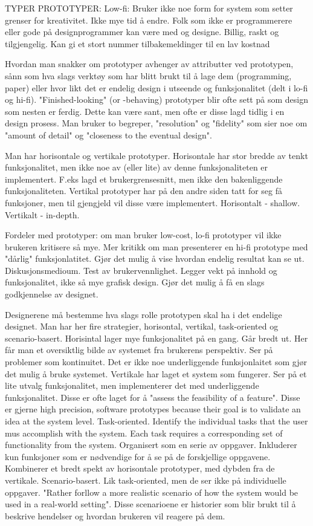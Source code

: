 TYPER PROTOTYPER:
Low-fi: Bruker ikke noe form for system som setter grenser for kreativitet. Ikke mye tid å endre. Folk som ikke er programmerere eller gode på designprogrammer kan være med og designe. Billig, raskt og tilgjengelig. Kan gi et stort nummer tilbakemeldinger til en lav kostnad

Hvordan man snakker om prototyper avhenger av attributter ved prototypen, sånn som hva slags verktøy som har blitt brukt til å lage dem (programming, paper) eller hvor likt det er endelig design i utseende og funksjonalitet (delt i lo-fi og hi-fi). "Finished-looking" (or -behaving) prototyper blir ofte sett på som design som nesten er ferdig. Dette kan være sant, men ofte er disse lagd tidlig i en design prosess. Man bruker to begreper, "resolution" og "fidelity" som sier noe om "amount of detail" og "closeness to the eventual design".

Man har horisontale og vertikale prototyper. Horisontale har stor bredde av tenkt funksjonalitet, men ikke noe av (eller lite) av denne funksjonaliteten er implementert. F.eks lagd et brukergrensesnitt, men ikke den bakenliggende funksjonaliteten. Vertikal prototyper har på den andre siden tatt for seg få funksjoner, men til gjengjeld vil disse være implementert. Horisontalt - shallow. Vertikalt - in-depth.

Fordeler med prototyper: om man bruker low-cost, lo-fi prototyper vil ikke brukeren kritisere så mye. Mer kritikk om man presenterer en hi-fi prototype med "dårlig" funksjonlatitet. Gjør det mulig å vise hvordan endelig resultat kan se ut. Diskusjonsmedioum. Test av brukervennlighet. Legger vekt på innhold og funksjonalitet, ikke så mye grafisk design. Gjør det mulig å få en slags godkjennelse av designet.

Designerene må bestemme hva slags rolle prototypen skal ha i det endelige designet. Man har her fire strategier, horisontal, vertikal, task-oriented og scenario-basert. Horisintal lager mye funksjonalitet på en gang. Går bredt ut. Her får man et oversiktlig bilde av systemet fra brukerens perspektiv. Ser på problemer som kontinuitet. Det er ikke noe underliggende funksjonlaitet som gjør det mulig å bruke systemet. Vertikale har laget et system som fungerer. Ser på et lite utvalg funksjonalitet, men implementerer det med underliggende funksjonalitet. Disse er ofte laget for å "assess the feasibility of a feature". Disse er gjerne high precision, software prototypes because their goal is to validate an idea at the system level. Task-oriented. Identify the individual tasks that the user mus accomplish with the system. Each task requires a corresponding set of functionality from the system. Organisert som en serie av oppgaver. Inkluderer kun funksjoner som er nødvendige for å se på de forskjellige oppgavene. Kombinerer et bredt spekt av horisontale prototyper, med dybden fra de vertikale. Scenario-basert. Lik task-oriented, men de ser ikke på individuelle oppgaver. "Rather forllow a more realistic scenario of how the system would be used in a real-world setting". Disse scenarioene er historier som blir brukt til å beskrive hendelser og hvordan brukeren vil reagere på dem.     

